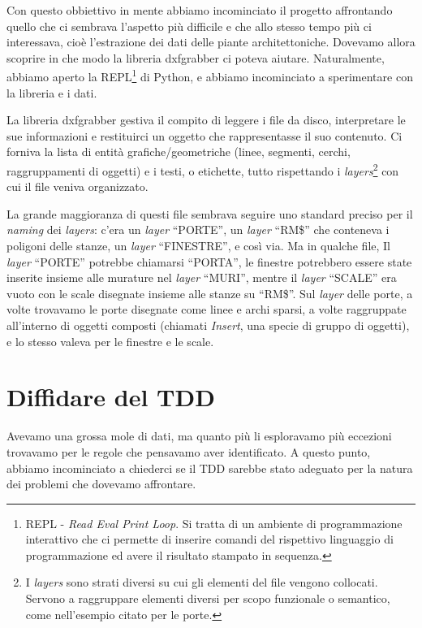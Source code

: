 \documentclass[12pt]{report}
\begin{document}
Con questo obbiettivo in mente abbiamo incominciato il progetto
affrontando quello che ci sembrava l'aspetto più difficile e che allo
stesso tempo più ci interessava, cioè l'estrazione dei dati delle
piante architettoniche. Dovevamo allora scoprire in che modo la
libreria dxfgrabber ci poteva aiutare. Naturalmente, abbiamo
aperto la REPL\footnote{
	REPL - \textit{Read Eval Print Loop}. Si tratta di un ambiente di
	programmazione interattivo che ci permette di inserire comandi del
	rispettivo linguaggio di programmazione ed avere il risultato
	stampato in sequenza. 
} 
di Python, e abbiamo incominciato a sperimentare con la libreria e i dati.

La libreria dxfgrabber gestiva il compito di leggere i file da disco,
interpretare le sue informazioni e restituirci un oggetto che
rappresentasse il suo contenuto. Ci forniva la lista di entità
grafiche/geometriche (linee, segmenti, cerchi, raggruppamenti di
oggetti) e i testi, o etichette, tutto rispettando i 
\textit{layers}\footnote{
	I \textit{layers} sono strati diversi su cui gli elementi del file
	vengono collocati. Servono a raggruppare elementi diversi per scopo
	funzionale o semantico, come nell'esempio citato per le porte.
}
con cui il file veniva organizzato. 

La grande maggioranza di questi
file sembrava seguire uno standard preciso per il \textit{naming} dei
\textit{layers}: c'era un \textit{layer} ``PORTE'', un \textit{layer} 
``RM\$'' che conteneva i poligoni delle stanze, un \textit{layer}
``FINESTRE'', e così via. Ma in qualche file, Il \textit{layer} ``PORTE''
potrebbe chiamarsi ``PORTA'', le finestre potrebbero essere state
inserite insieme alle murature nel \textit{layer} ``MURI'', mentre
il \textit{layer} ``SCALE'' era vuoto con le scale disegnate
insieme alle stanze su ``RM\$''. Sul \textit{layer} delle porte,
a volte trovavamo le porte disegnate come linee e archi sparsi,
a volte raggruppate all'interno di oggetti composti (chiamati
\textit{Insert}, una specie di gruppo di oggetti), e lo stesso 
valeva per le finestre e le scale. 

\section{Diffidare del TDD}

Avevamo una grossa mole di dati, ma quanto più li esploravamo più
eccezioni trovavamo per le regole che pensavamo aver 
identificato. A questo punto, abbiamo incominciato a chiederci se
il TDD sarebbe stato adeguato per la natura dei problemi che
dovevamo affrontare.
\end{document}
